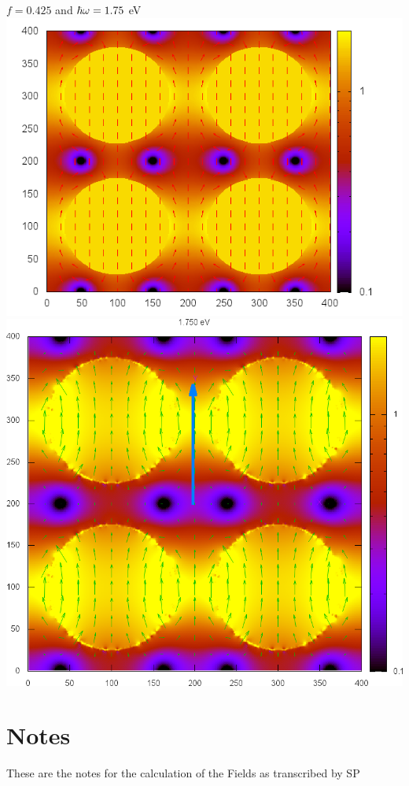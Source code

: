 \documentclass[preprint,12pt]{revtex4}
\begin{document}
\begin{center}
$f=0.425$ and $\hbar\omega=1.75$ eV
\includegraphics[scale=.31]{plots/manda/dipolar_W1.75_f.425}%
\includegraphics[scale=.2]{plots/manda/e-cilindro_A0.00_S1.000_f0.425_principal_0.00_ave_Nh_100_epsa_au_W1.750_epsb_8.000-0.000_dir_yp-dat.2x2}%
\end{center}
 

\section{Notes}
These are the notes for the calculation of the Fields as transcribed
by SP
\end{document}
